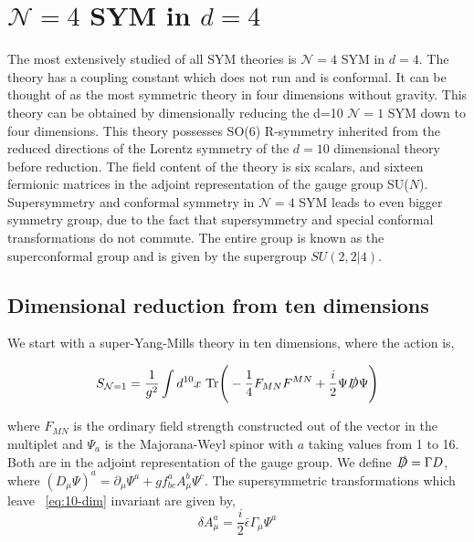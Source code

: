 \section{$\mathcal{N} = 4 $ SYM in $d=4$}

The most extensively studied of all SYM theories is $\mathcal{N} = 4 $ SYM in $d=4$. 
The theory has a coupling constant which does not run and is conformal. 
It can be thought of as the most symmetric theory in four dimensions without gravity. 
This theory can be obtained by dimensionally reducing the d=10 $\mathcal{N} = 1 $ SYM down to 
four dimensions. This theory possesses SO(6) R-symmetry inherited from the reduced directions of the Lorentz symmetry of 
the $d=10$ dimensional theory before reduction. The field content of the theory is six scalars, 
and sixteen fermionic matrices in the adjoint representation of the gauge group SU($N$).  
Supersymmetry and conformal symmetry in $\mathcal{N} = 4 $ SYM leads
to even bigger symmetry group, due to the fact that supersymmetry and
special conformal transformations do not commute. 
The entire group is known as the superconformal group and is given by
the supergroup $SU(2, 2|4)$. 



\subsection{Dimensional reduction from ten dimensions} 

We start with a super-Yang-Mills theory in ten dimensions, where the action is, 

\begin{equation}
S_{\mathcal{N} = 1} = \frac{1}{g^2} \int d^{10} x ~ \mathrm{Tr} \Bigg (-\frac{1}{4} F_{MN}F^{MN} +\frac{i}{2} \Psi \slashed{D} \Psi \Bigg) 
\label{eq:10-dim} 
\end{equation}

where $F_{MN}$ is the ordinary field strength constructed out of the vector in the multiplet
and $\Psi_{a}$ is the Majorana-Weyl spinor with $a$ taking values from 1 to 16. Both are in the 
adjoint representation of the gauge group. We define $ \slashed{D} = \Gamma D $, where
$ (D_{\mu} \Psi)^{a} = \partial_{\mu} \Psi^{a} + g f^{a}_{bc} A_{\mu}^{b} \Psi^{c}$. 
The supersymmetric transformations which leave ~\ref{eq:10-dim} invariant are given by, 
\begin{equation}
\delta A_{\mu}^{a} = \frac{i}{2} \bar{\epsilon} \Gamma_{\mu} \Psi^{a} 
\end{equation} 

